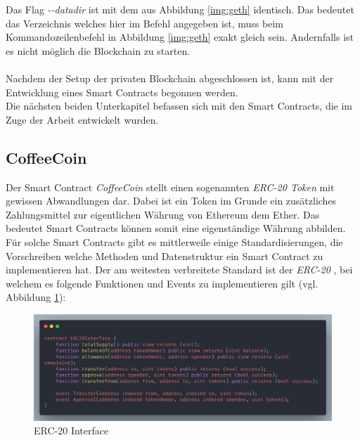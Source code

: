 
Das Flag \textit{-{}-datadir} ist mit dem aus Abbildung \ref{img:geth} identisch. Das bedeutet das Verzeichnis welches hier im Befehl angegeben ist, muss beim Kommandozeilenbefehl in Abbildung \ref{img:geth} exakt gleich sein. Andernfalls ist es nicht möglich die Blockchain zu starten.\\\\
Nachdem der Setup der privaten Blockchain abgeschlossen ist, kann mit der Entwicklung eines Smart Contracts begonnen werden.\cite{Eth:Guide} \\
Die nächsten beiden Unterkapitel befassen sich mit den Smart Contracts, die im Zuge der Arbeit entwickelt wurden.

\subsection{CoffeeCoin}
\label{subsec:cc}
Der Smart Contract \textit{CoffeeCoin} stellt einen sogenannten \textit{ERC-20 Token} mit gewissen Abwandlungen dar. Dabei ist ein Token im Grunde ein zusätzliches Zahlungsmittel zur eigentlichen Währung von Ethereum dem Ether. Das bedeutet Smart Contracts können somit eine eigenständige Währung abbilden. Für solche Smart Contracts gibt es mittlerweile einige Standardisierungen, die Vorschreiben welche Methoden und Datenstruktur ein Smart Contract zu implementieren hat. Der am weitesten verbreitete Standard ist der \textit{ERC-20} \cite{ERC:Wiki, ERC:Github, ERC:BlockGeeks}, bei welchem es folgende Funktionen und Events zu implementieren gilt (vgl. Abbildung \ref{img:ERC}):

\begin{figure}[th!]
	\centering
	\includegraphics[width=.9\columnwidth]{./Abbildungen/Kapitel_03/erc20.png}
	\caption{ERC-20 Interface}
	\label{img:ERC}
\end{figure}

